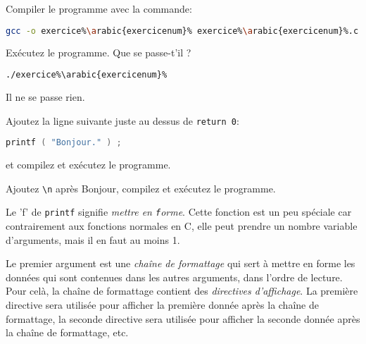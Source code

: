 \question Compiler le programme avec la commande:
\begin{solution}
  \begin{lstlisting}[language=bash]
    gcc -o exercice%\arabic{exercicenum}% exercice%\arabic{exercicenum}%.c
  \end{lstlisting}
\end{solution}

\question Exécutez le programme. Que se passe-t'il ?
\begin{solution}
  \begin{lstlisting}[language=bash]
    ./exercice%\arabic{exercicenum}%
  \end{lstlisting}
  Il ne se passe rien.
\end{solution}

\question Ajoutez la ligne suivante juste au dessus de \texttt{return 0}:
\begin{lstlisting}[language=C]
  printf ( "Bonjour." ) ;
\end{lstlisting}
et compilez et exécutez le programme.

\begin{center}
\end{center}

\question Ajoutez \verb+\n+ après Bonjour,   compilez et exécutez le programme.

\begin{center}
\end{center}


Le 'f' de \texttt{printf} signifie \emph{mettre en
  \texttt{f}orme}. Cette fonction est un peu spéciale car
contrairement aux fonctions normales en C, elle peut prendre un nombre
variable d'arguments, mais il en faut au moins 1. 

Le premier argument est une \emph{chaîne de formattage} qui sert à
mettre en forme les données qui sont contenues dans les autres
arguments, dans l'ordre de lecture. Pour celà, la chaîne de formattage
contient des \emph{directives d'affichage}. La première directive sera
utilisée pour afficher la première donnée après la chaîne de
formattage, la seconde directive sera utilisée pour afficher la
seconde donnée après la chaîne de formattage, etc.

